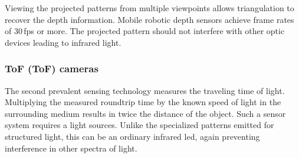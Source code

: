 Viewing the projected patterns from multiple viewpoints allows triangulation to recover the depth information.
Mobile robotic depth sensors achieve frame rates of 30\,\acrshort{fps} or more.
The projected pattern should not interfere with other optic devices leading to infrared light.

\subsubsection{\acrlong{ToF} (\acrshort{ToF}) cameras}

The second prevalent sensing technology measures the traveling time of light\cite[p. 27-41]{hansard_springer2012}.
Multiplying the measured roundtrip time by the known speed of light in the surrounding medium results in twice the distance of the object.
Such a sensor system requires a light sources.
Unlike the specialized patterns emitted for structured light, this can be an ordinary infrared \acrshort{led}, again preventing interference in other spectra of light.
